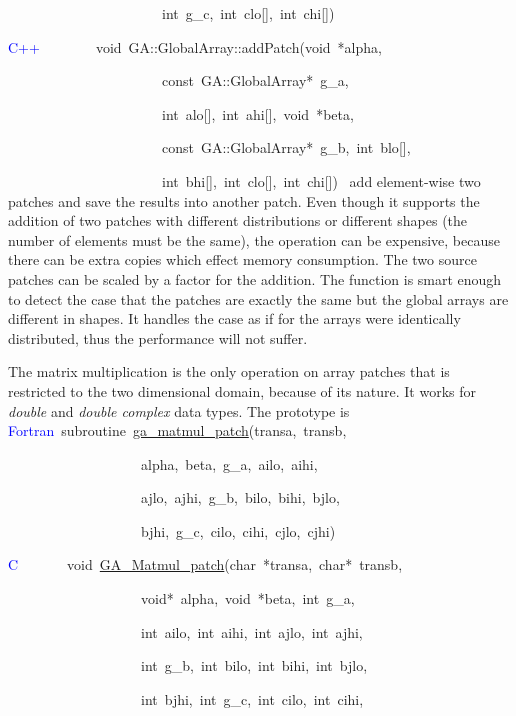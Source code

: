 ~~~~~~~~~~~~~~~~~~~~~~int~g\_c,~int~clo{[}{]},~int~chi{[}{]})~

\textcolor{blue}{C++}~~~~~~~~void~GA::GlobalArray::addPatch(void~{*}alpha,~

~~~~~~~~~~~~~~~~~~~~~~const~GA::GlobalArray{*}~g\_a,~

~~~~~~~~~~~~~~~~~~~~~~int~alo{[}{]},~int~ahi{[}{]},~void~{*}beta,~

~~~~~~~~~~~~~~~~~~~~~~const~GA::GlobalArray{*}~g\_b,~int~blo{[}{]},~

~~~~~~~~~~~~~~~~~~~~~~int~bhi{[}{]},~int~clo{[}{]},~int~chi{[}{]})~
add element-wise two patches and save the results into another patch.
Even though it supports the addition of two patches with different
distributions or different shapes (the number of elements must be
the same), the operation can be expensive, because there can be extra
copies which effect memory consumption. The two source patches can
be scaled by a factor for the addition. The function is smart enough
to detect the case that the patches are exactly the same but the global
arrays are different in shapes. It handles the case as if for the
arrays were identically distributed, thus the performance will not
suffer.

The matrix multiplication is the only operation on array patches that
is restricted to the two dimensional domain, because of its nature.
It works for\emph{ double} and \emph{double complex} data types. The
prototype is
\textcolor{blue}{Fortran}~subroutine~\href{http://www.emsl.pnl.gov/docs/global/ga_ops.html\#ga_matmul_patch}{ga\_{}matmul\_{}patch}(transa,~transb,~

~~~~~~~~~~~~~~~~~~~alpha,~beta,~g\_a,~ailo,~aihi,~

~~~~~~~~~~~~~~~~~~~ajlo,~ajhi,~g\_b,~bilo,~bihi,~bjlo,~

~~~~~~~~~~~~~~~~~~~bjhi,~g\_c,~cilo,~cihi,~cjlo,~cjhi)~

\textcolor{blue}{C}~~~~~~~void~\href{http://www.emsl.pnl.gov/docs/global/c_nga_ops.html\#ga_matmul_patch}{GA\_{}Matmul\_{}patch}(char~{*}transa,~char{*}~transb,

~~~~~~~~~~~~~~~~~~~void{*}~alpha,~void~{*}beta,~int~g\_a,~

~~~~~~~~~~~~~~~~~~~int~ailo,~int~aihi,~int~ajlo,~int~ajhi,~

~~~~~~~~~~~~~~~~~~~int~g\_b,~int~bilo,~int~bihi,~int~bjlo,~

~~~~~~~~~~~~~~~~~~~int~bjhi,~int~g\_c,~int~cilo,~int~cihi,~

